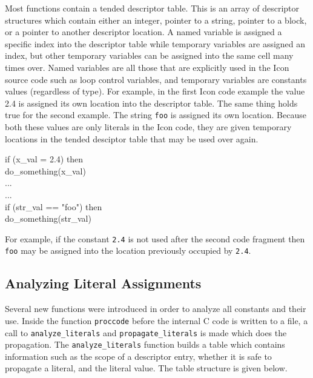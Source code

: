 Most functions contain a tended descriptor table. This is an array of
descriptor structures which contain either an integer, pointer to a
string, pointer to a block, or a pointer to another descriptor
location. A named variable is assigned a specific index into the
descriptor table while temporary variables are assigned an index, but
other temporary variables can be assigned into the same cell many
times over. Named variables are all those that are explicitly used in
the Icon source code such as loop control variables, and temporary
variables are constants values (regardless of type). For example, in
the first Icon code example the value 2.4 is assigned its own location
into the descriptor table. The same thing holds true for the second
example. The string \texttt{{\textquotedbl}foo{\textquotedbl}} is
assigned its own location. Because both these values are only literals
in the Icon code, they are given temporary locations in the tended
desciptor table that may be used over again.

\begin{iconcode}
\>   if (x\_val = 2.4) then \\
\> \>   do\_something(x\_val) \\
\>   ... \\
\>   ... \\
\>   if (str\_val == "foo") then \\
\> \>   do\_something(str\_val)
\end{iconcode}


For example, if the constant \texttt{2.4} is not used after the second
code fragment then \texttt{{\textquotedbl}foo{\textquotedbl}} may be
assigned into the location previously occupied by \texttt{2.4}.


\subsection{Analyzing Literal Assignments}

Several new functions were introduced in order to analyze all
constants and their use. Inside the function \texttt{proccode} before
the internal C code is written to a file, a call to
\texttt{analyze\_literals} and \texttt{propagate\_literals} is made
which does the propagation. The \texttt{analyze\_literals} function
builds a table which contains information such as the scope of a
descriptor entry, whether it is safe to propagate a literal, and the
literal value. The table structure is given below.

